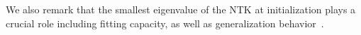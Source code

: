 We also remark that the smallest eigenvalue of the NTK at initialization plays a crucial role including fitting capacity, as well as generalization behavior~\citep{SA-SD-WH-ZL-RW:19,AM-YZ:20,CL-LZ-MB:20,ng2021opt,ng2021hermite2,oymak2020hermite}.
%

